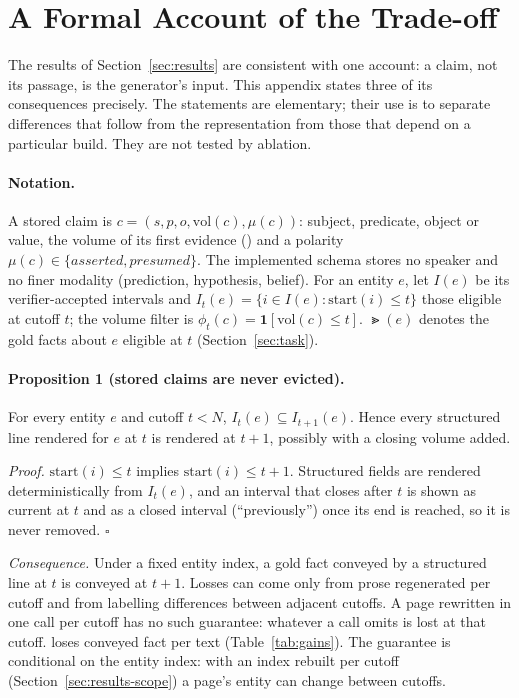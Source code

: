 \section{A Formal Account of the Trade-off}
\label{app:formal}

The results of Section~\ref{sec:results} are consistent with one account: a claim, not its
passage, is the generator's input. This appendix states three of its consequences precisely.
The statements are elementary; their use is to separate differences that follow from the
representation from those that depend on a particular build. They are not tested by
ablation.

\paragraph{Notation.}
A stored claim is $c=(s,p,o,\mathrm{vol}(c),\mu(c))$: subject, predicate, object or value,
the volume of its first evidence (\firstvol) and a polarity
$\mu(c)\in\{\textit{asserted},\textit{presumed}\}$. The implemented schema stores no speaker
and no finer modality (prediction, hypothesis, belief). For an entity $e$, let
$I(e)$ be its verifier-accepted intervals and $I_t(e)=\{i\in I(e):\mathrm{start}(i)\le t\}$
those eligible at cutoff $t$; the volume filter is $\phi_t(c)=\mathbf{1}[\mathrm{vol}(c)\le t]$.
$\Gt(e)$ denotes the gold facts about $e$ eligible at $t$ (Section~\ref{sec:task}).

\paragraph{Proposition 1 (stored claims are never evicted).}
For every entity $e$ and cutoff $t<N$, $I_t(e)\subseteq I_{t+1}(e)$. Hence every structured
line rendered for $e$ at $t$ is rendered at $t+1$, possibly with a closing volume added.

\emph{Proof.} $\mathrm{start}(i)\le t$ implies $\mathrm{start}(i)\le t+1$. Structured fields
are rendered deterministically from $I_t(e)$, and an interval that closes after $t$ is shown
as current at $t$ and as a closed interval (``previously'') once its end is reached, so it is
never removed. $\square$

\emph{Consequence.} Under a fixed entity index, a gold fact conveyed by a structured line at
$t$ is conveyed at $t+1$. Losses can come only from prose regenerated per cutoff and from
labelling differences between adjacent cutoffs. A page rewritten in one call per cutoff has no such
guarantee: whatever a call omits is lost at that cutoff. \sys loses  conveyed fact
per text (Table~\ref{tab:gains}). The guarantee is conditional on the entity index: with an
index rebuilt per cutoff (Section~\ref{sec:results-scope}) a page's entity can change between
cutoffs.

